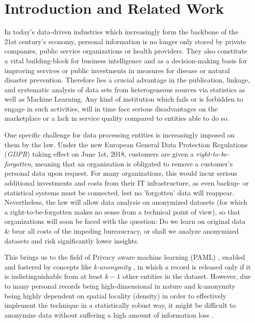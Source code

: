 \documentclass{llncs}
\begin{document}
\renewcommand{\thesubfigure}{\thefigure.\arabic{subfigure}}
\makeatletter
\renewcommand{\p@subfigure}{}
\renewcommand{\@thesubfigure}{\thesubfigure:\hskip\subfiglabelskip}
\makeatother


\section{Introduction and Related Work}
\label{sect:introduction}

In today's data-driven industries which increasingly form the backbone of the 21st century's economy, personal information is no longer only stored by private companies, public service organizations or health providers. They also constitute a vital building-block for business intelligence and as a decision-making basis for improving services or public investments in measures for disease or natural disaster prevention. Therefore lies a crucial advantage in the publication, linkage, and systematic analysis of data sets from heterogeneous sources via statistics as well as Machine Learning. Any kind of institution which fails or is forbidden to engage in such activities, will in time face serious disadvantages on the marketplace or a lack in service quality compared to entities able to do so.

One specific challenge for data processing entities is increasingly imposed on them by the law. Under the new European General Data Protection Regulations (\textit{GDPR}) taking effect on June 1st, 2018, customers are given a \textit{right-to-be-forgotten}, meaning that an organization is obligated to remove a customer's personal data upon request. For many organizations, this would incur serious additional investments and costs from their IT infrastructure, as even backup- or statistical systems must be connected, lest no 'forgotten' data will reappear. Nevertheless, the law will allow data analysis on anonymized datasets (for which a right-to-be-forgotten makes no sense from a technical point of view), so that organizations will soon be faced with the question: Do we learn on original data \& bear all costs of the impeding bureaucracy, or shall we analyze anonymized datasets and risk significantly lower insights.

This brings us to the field of Privacy aware machine learning (PAML) \cite{DuchiJordan:2014:PrivacyAwareLearning}, enabled and fostered by concepts like \textit{k-anonymity} \cite{Samarati:2001:kAnonymity}, in which a record is released only if it is indistinguishable from at least $k-1$ other entities in the dataset. However, due to many personal records being high-dimensional in nature and k-anonymity being highly dependent on spatial locality (density) in order to effectively implement the technique in a statistically robust way, it might be difficult to anonymize data without suffering a high amount of information loss \cite{Aggarwal:2005:kAnonymity}.
\end{document}
